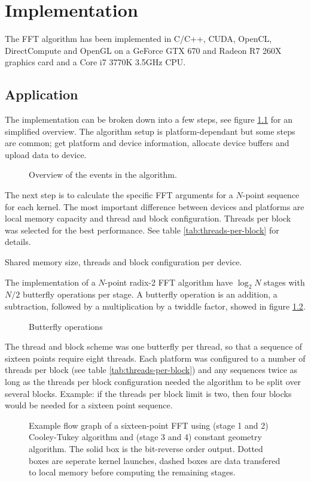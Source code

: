 \chapter{Implementation}

The FFT algorithm has been implemented in C/C++, CUDA, OpenCL, DirectCompute and OpenGL on a GeForce GTX 670 and Radeon R7 260X graphics card and a Core i7 3770K 3.5GHz CPU.

\section{Application}

The implementation can be broken down into a few steps, see figure \ref{fig:algorithm-overview} for an simplified overview. The algorithm setup is platform-dependant but some steps are common; get platform and device information, allocate device buffers and upload data to device.
\begin{figure}
	\centering
	
	\caption{Overview of the events in the algorithm.}
	\label{fig:algorithm-overview}
\end{figure}

The next step is to calculate the specific FFT arguments for a $N$-point sequence for each kernel. The most important difference between devices and platforms are local memory capacity and thread and block configuration. Threads per block was selected for the best performance. See table \ref{tab:threads-per-block} for details.
\begin{table}
	\centering
	
	\caption{Shared memory size, threads and block configuration per device.}
	\label{tab:threads-per-block}
\end{table}

The implementation of a $N$-point radix-2 FFT algorithm have $\log_2 N$ stages with $N/2$ butterfly operations per stage. A butterfly operation is an addition, a subtraction, followed by a multiplication by a twiddle factor, showed in figure \ref{fig:butterfly}.
\begin{figure}[h]
	\centering
	
	\caption{Butterfly operations}
	\label{fig:butterfly}
\end{figure}

The thread and block scheme was one butterfly per thread, so that a sequence of sixteen points require eight threads. Each platform was configured to a number of threads per block (see table \ref{tab:threads-per-block}) and any sequences twice as long as the threads per block configuration needed the algorithm to be split over several blocks. Example: if the threads per block limit is two, then four blocks would be needed for a sixteen point sequence.
\begin{figure}
	
	\caption{Example flow graph of a sixteen-point FFT using (stage 1 and 2) Cooley-Tukey algorithm and (stage 3 and 4) constant geometry algorithm. The solid box is the bit-reverse order output. Dotted boxes are seperate kernel launches, dashed boxes are data transfered to local memory before computing the remaining stages.}
	\label{fig:flowgraph-16}
\end{figure}

